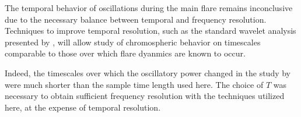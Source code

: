 The temporal behavior of oscillations during the main flare remains
inconclusive due to the necessary balance between temporal and frequency
resolution.
Techniques to improve temporal resolution,
such as the standard wavelet analysis
presented by \cite{Torrence1998},
will allow study of chromospheric behavior on timescales comparable to those
over which flare dyanmics are known to occur.

Indeed, the timescales over which the oscillatory power changed in the study by
\cite{Milligan2017}
were much shorter than the sample time length used here.
The choice of $T$ was necessary to obtain sufficient frequency resolution
with the techniques utilized here, at the expense of temporal resolution.
